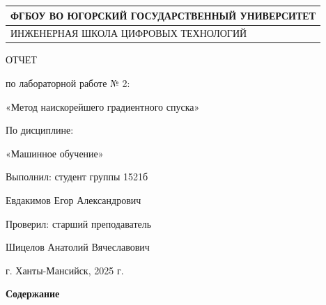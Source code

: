 \documentclass{article}%
\begin{document}
%
\normalsize%
\begin{longtable}{|>{\centering\arraybackslash}p{17.176750000000002cm}|}%
\hline%
ФГБОУ ВО ЮГОРСКИЙ ГОСУДАРСТВЕННЫЙ УНИВЕРСИТЕТ%
 \\ \hline \endfirsthead%
\hline%
ИНЖЕНЕРНАЯ ШКОЛА ЦИФРОВЫХ ТЕХНОЛОГИЙ%
 \\ \hline%
\end{longtable}%
\begin{center}%
ОТЧЕТ%
%
\end{center}%
\begin{center}%
по лабораторной работе № 2:%
%
\end{center}%
\begin{center}%
«Метод наискорейшего градиентного спуска»%
%
\end{center}%
\begin{center}%
По дисциплине:%
%
\end{center}%
\begin{center}%
«Машинное обучение»%
%
\end{center}%
\begin{flushleft}%
Выполнил: студент группы 1521б%
%
\end{flushleft}%
\begin{flushleft}%
Евдакимов Егор Александрович%
%
\end{flushleft}%
\begin{flushleft}%
Проверил: старший преподаватель%
%
\end{flushleft}%
\begin{flushleft}%
Шицелов Анатолий Вячеславович%
%
\end{flushleft}%
\begin{center}%
г. Ханты-Мансийск, 2025 г.%
%
\end{center}%
\begin{center}%
\textbf{Содержание}%
%
\end{center}%
\begin{flushleft}%
%
\end{flushleft}%
\end{document}
